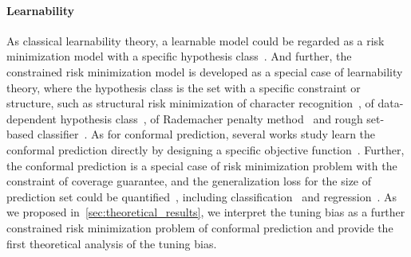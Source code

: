 \paragraph{Learnability}
As classical learnability theory, a learnable model could be regarded as a risk minimization model with a specific hypothesis class~\citep{vapnik1971uniform,vapnik1991principles,vandervaart1996weak, vapnik1999overview, vershynin2018highdimensional}.
And further, the constrained risk minimization model is developed as a special case of learnability theory, where the hypothesis class is the set with a specific constraint or structure, such as structural risk minimization of character recognition~\citep{guyon1991structural}, of data-dependent hypothesis class~\citep{shawe-taylor1998structural}, of Rademacher penalty method~\citep{koltchinskii2001rademacher} and rough set-based classifier~\citep{liu2020structural}.
As for conformal prediction, several works study learn the conformal prediction directly by designing a specific objective function~\citep{stutz2022learning, noorani2024conformal}. 
Further, the conformal prediction is a special case of risk minimization problem with the constraint of coverage guarantee, and the generalization loss for the size of prediction set could be quantified~\citep{gupta2022nested, yang2024selection}, including classification~\citep{bai2022efficient} and regression~\citep{gupta2022nested, fan2024utopia}.
As we proposed in~\cref{sec:theoretical_results}, we interpret the tuning bias as a further constrained risk minimization problem of conformal prediction and provide the first theoretical analysis of the tuning bias.

